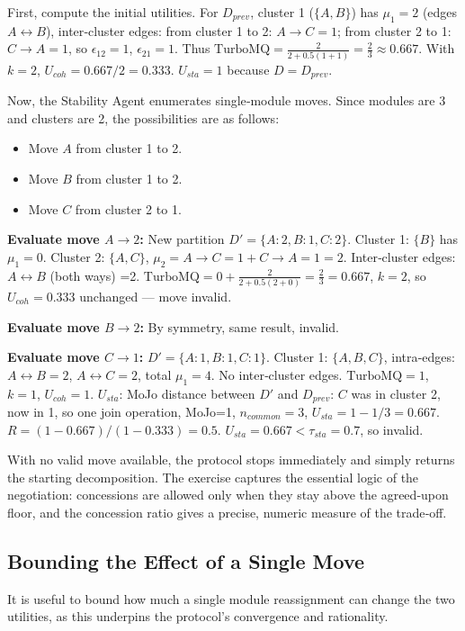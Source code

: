 \documentclass[conference]{IEEEtran}
\begin{document}
First, compute the initial utilities. For $D_{prev}$, cluster 1 ($\{A,B\}$) has $\mu_1=2$ (edges $A\leftrightarrow B$), inter‑cluster edges: from cluster 1 to 2: $A\to C=1$; from cluster 2 to 1: $C\to A=1$, so $\epsilon_{12}=1$, $\epsilon_{21}=1$. Thus $\mathrm{TurboMQ} = \frac{2}{2+0.5(1+1)} = \frac{2}{3} \approx 0.667$. With $k=2$, $U_{coh}=0.667/2=0.333$. $U_{sta}=1$ because $D=D_{prev}$.

Now, the Stability Agent enumerates single‑module moves. Since modules are 3 and clusters are 2, the possibilities are as follows:
\begin{itemize}
\item Move $A$ from cluster 1 to 2.
\item Move $B$ from cluster 1 to 2.
\item Move $C$ from cluster 2 to 1.
\end{itemize}

\noindent\textbf{Evaluate move $A\to 2$:} 
New partition $D' = \{A:2, B:1, C:2\}$. Cluster 1: $\{B\}$ has $\mu_1=0$. Cluster 2: $\{A,C\}$, $\mu_2 = A\to C=1 + C\to A=1 = 2$. Inter‑cluster edges: $A\leftrightarrow B$ (both ways) =2. $\mathrm{TurboMQ} = 0 + \frac{2}{2+0.5(2+0)} = \frac{2}{3}=0.667$, $k=2$, so $U_{coh}=0.333$ unchanged — move invalid.

\noindent\textbf{Evaluate move $B\to 2$:} By symmetry, same result, invalid.

\noindent\textbf{Evaluate move $C\to 1$:} 
$D' = \{A:1, B:1, C:1\}$. Cluster 1: $\{A,B,C\}$, intra‑edges: $A\leftrightarrow B=2$, $A\leftrightarrow C=2$, total $\mu_1=4$. No inter‑cluster edges. $\mathrm{TurboMQ}=1$, $k=1$, $U_{coh}=1$. $U_{sta}$: MoJo distance between $D'$ and $D_{prev}$: $C$ was in cluster 2, now in 1, so one join operation, MoJo=1, $n_{common}=3$, $U_{sta}=1-1/3=0.667$. $R = (1-0.667)/(1-0.333) = 0.5$. $U_{sta}=0.667 < \tau_{sta}=0.7$, so invalid.

With no valid move available, the protocol stops immediately and simply returns the starting decomposition.  The exercise captures the essential logic of the negotiation: concessions are allowed only when they stay above the agreed‑upon floor, and the concession ratio gives a precise, numeric measure of the trade‑off.

\subsection{Bounding the Effect of a Single Move}
It is useful to bound how much a single module reassignment can change the two utilities, as this underpins the protocol’s convergence and rationality.
\end{document}
